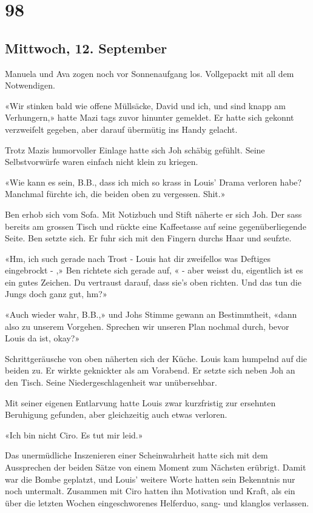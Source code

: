 \chapter{98}

\section{Mittwoch, 12.
September}



Manuela und Ava zogen noch vor Sonnenaufgang los. Vollgepackt mit all
dem Notwendigen.

«Wir stinken bald wie offene Müllsäcke, David und ich, und sind knapp am
Verhungern,» hatte Mazi tags zuvor hinunter gemeldet. Er hatte sich
gekonnt verzweifelt gegeben, aber darauf übermütig ins Handy gelacht.

Trotz Mazis humorvoller Einlage hatte sich Joh schäbig gefühlt. Seine Selbstvorwürfe waren einfach nicht klein zu kriegen.

«Wie kann es sein, B.B., dass ich mich so krass in Louis’ Drama
verloren habe? Manchmal fürchte ich, die beiden oben zu vergessen. Shit.»

Ben erhob sich vom Sofa. Mit Notizbuch und Stift näherte er sich Joh.
Der sass bereits am grossen Tisch und rückte eine Kaffeetasse auf seine
gegenüberliegende Seite. Ben setzte sich. Er fuhr sich mit den Fingern
durchs Haar und seufzte.

«Hm, ich such gerade nach Trost - Louis hat dir zweifellos was Deftiges eingebrockt - ,» Ben richtete sich gerade auf, « - aber weisst du, eigentlich ist es ein gutes Zeichen. Du vertraust darauf, dass sie’s oben richten. Und das tun die Jungs doch ganz gut, hm?»

«Auch wieder wahr, B.B.,» und Johs Stimme gewann an Bestimmtheit, «dann also zu unserem Vorgehen. Sprechen wir unseren Plan nochmal durch, bevor Louis da ist, okay?»

\sectionbreak

Schrittgeräusche von oben näherten sich der Küche. Louis
kam humpelnd auf die beiden zu. Er wirkte geknickter als am Vorabend. Er
setzte sich neben Joh an den Tisch. Seine Niedergeschlagenheit war
unübersehbar.

Mit seiner eigenen Entlarvung hatte Louis zwar kurzfristig zur ersehnten
Beruhigung gefunden, aber gleichzeitig auch etwas verloren.

«Ich bin nicht Ciro. Es tut mir leid.»

Das unermüdliche Inszenieren einer Scheinwahrheit hatte sich mit dem
Aussprechen der beiden Sätze von einem Moment zum Nächsten erübrigt.
Damit war die Bombe geplatzt, und Louis’ weitere Worte hatten sein
Bekenntnis nur noch untermalt. Zusammen mit Ciro hatten ihn Motivation
und Kraft, als ein über die letzten Wochen eingeschworenes Helferduo,
sang- und klanglos verlassen.

